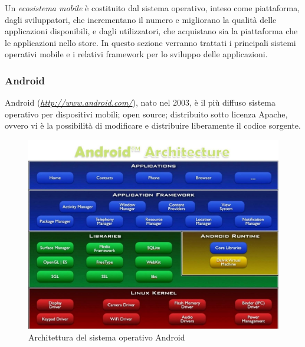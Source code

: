 Un \emph{ecosistema mobile} è costituito dal sistema operativo, inteso come piattaforma, dagli sviluppatori, che incrementano il numero e migliorano la qualità delle applicazioni disponibili, e dagli utilizzatori, che acquistano sia la piattaforma che le applicazioni nello store.
In questo sezione verranno trattati i principali sistemi operativi mobile e i relativi framework per lo sviluppo delle applicazioni.


\subsubsection{Android}
Android (\emph{\url{http://www.android.com/}}), nato nel 2003, è il più diffuso sistema operativo per dispositivi mobili; open source; distribuito sotto licenza Apache, ovvero vi è la possibilità di modificare e distribuire liberamente il codice sorgente.\\
\begin{figure}
\begin{center}
\includegraphics[scale=0.5]{imgs/android_architecture.jpg} 
\caption{Architettura del sistema operativo Android\label{androidarchitecture}}
\end{center}
\end{figure}

